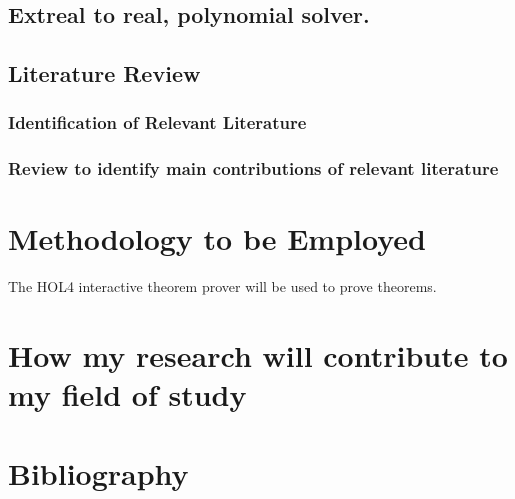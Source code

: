 \documentclass{article}
\begin{document}
\subsubsection{}	


\subsection {Extreal to real, polynomial solver.}

\subsection{Literature Review}

\subsubsection{Identification of Relevant Literature}

\subsubsection{Review to identify main contributions of relevant literature}

\section{Methodology to be Employed}

The HOL4 interactive theorem prover will be used to prove theorems.

\section{How my research will contribute to my field of study}

\section{Bibliography}
\end{document}
